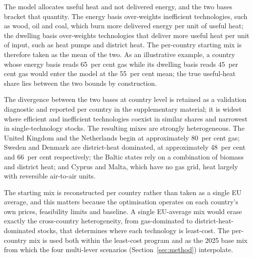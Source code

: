 The model allocates useful heat and not delivered energy, and the two bases
bracket that quantity. The energy basis over-weights inefficient technologies,
such as wood, oil and coal, which burn more delivered energy per unit of useful
heat; the dwelling basis over-weights technologies that deliver more useful heat
per unit of input, such as heat pumps and district heat. The per-country starting
mix is therefore taken as the mean of the two. As an illustrative example, a
country whose energy basis reads 65~per cent gas while its dwelling basis reads
45~per cent gas would enter the model at the 55~per cent mean; the true useful-heat
share lies between the two bounds by construction.

The divergence between the two bases at country level is retained as a validation
diagnostic and reported per country in the supplementary material; it is
widest where efficient and inefficient technologies coexist in similar shares and
narrowest in single-technology stocks. The resulting mixes are strongly
heterogeneous. The United Kingdom and the Netherlands begin at approximately 80~per cent
gas; Sweden and Denmark are district-heat dominated, at approximately
48~per cent and 66~per cent respectively; the Baltic states rely on a combination
of biomass and district heat; and Cyprus and Malta, which have no gas grid, heat
largely with reversible air-to-air units.

The starting mix is reconstructed per country rather than taken as a single EU
average, and this matters because the optimisation operates on each country's own
prices, feasibility limits and
baseline. A single EU-average mix would erase exactly the cross-country
heterogeneity, from gas-dominated to district-heat-dominated stocks, that
determines where each technology is least-cost. The per-country mix is used both
within the least-cost program and as the 2025 base mix from which the four multi-lever
scenarios (Section~\ref{sec:method}) interpolate.

